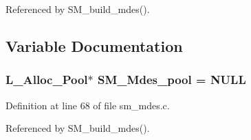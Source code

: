 Referenced by SM\_\-build\_\-mdes().

\subsection{Variable Documentation}
\subsubsection{\setlength{\rightskip}{0pt plus 5cm}\bf{L\_\-Alloc\_\-Pool}$\ast$ \bf{SM\_\-Mdes\_\-pool} = \bf{NULL}\hspace{0.3cm}{\tt  [static]}}\label{sm__mdes_8c_24f5ce3df7b42ff05d92c8a588b5ec4d}




Definition at line 68 of file sm\_\-mdes.c.

Referenced by SM\_\-build\_\-mdes().
